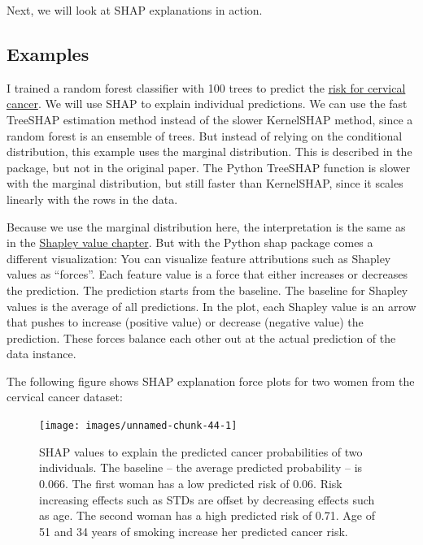 \documentclass[12pt,]{krantz}
\begin{document}
Next, we will look at SHAP explanations in action.

\subsection{Examples}\label{examples-5}

I trained a random forest classifier with 100 trees to predict the
\protect\hyperlink{cervical}{risk for cervical cancer}. We will use SHAP
to explain individual predictions. We can use the fast TreeSHAP
estimation method instead of the slower KernelSHAP method, since a
random forest is an ensemble of trees. But instead of relying on the
conditional distribution, this example uses the marginal distribution.
This is described in the package, but not in the original paper. The
Python TreeSHAP function is slower with the marginal distribution, but
still faster than KernelSHAP, since it scales linearly with the rows in
the data.

Because we use the marginal distribution here, the interpretation is the
same as in the \protect\hyperlink{shapley}{Shapley value chapter}. But
with the Python shap package comes a different visualization: You can
visualize feature attributions such as Shapley values as ``forces''.
Each feature value is a force that either increases or decreases the
prediction. The prediction starts from the baseline. The baseline for
Shapley values is the average of all predictions. In the plot, each
Shapley value is an arrow that pushes to increase (positive value) or
decrease (negative value) the prediction. These forces balance each
other out at the actual prediction of the data instance.

The following figure shows SHAP explanation force plots for two women
from the cervical cancer dataset:

\begin{figure}

{\centering \texttt{[image: images/unnamed-chunk-44-1]} 

}

\caption{SHAP values to explain the predicted cancer probabilities of two individuals. The baseline -- the average predicted probability -- is 0.066. The first woman has a low predicted risk of 0.06. Risk increasing effects such as STDs are offset by decreasing effects such as age. The second woman has a high predicted risk of 0.71. Age of 51 and 34 years of smoking increase her predicted cancer risk.}\label{fig:unnamed-chunk-44}
\end{figure}
\end{document}
